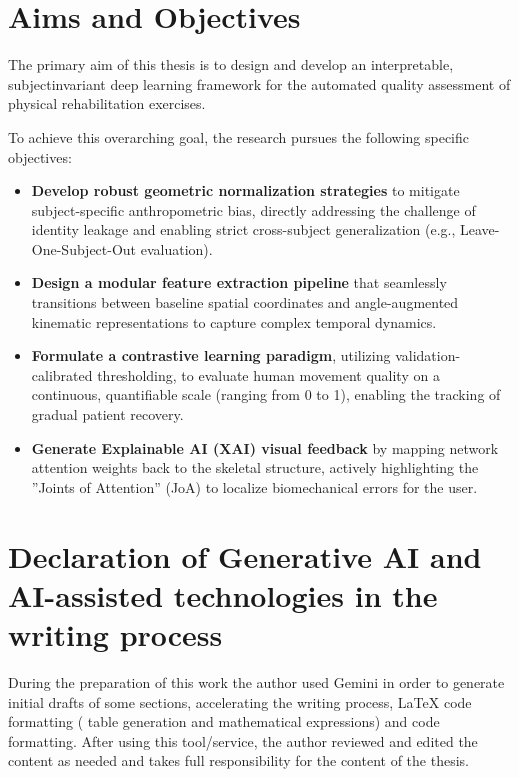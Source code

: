 \section{Aims and Objectives}
\label{sec:intro-aims}

The primary aim of this thesis is to design and develop an interpretable, subjectinvariant deep learning framework for the automated quality assessment of physical rehabilitation exercises. 

To achieve this overarching goal, the research pursues the following specific objectives:

\begin{itemize}
	\item \textbf{Develop robust geometric normalization strategies} to mitigate subject-specific anthropometric bias, directly addressing the challenge of identity leakage and enabling strict cross-subject generalization (e.g., Leave-One-Subject-Out evaluation).
	\item \textbf{Design a modular feature extraction pipeline} that seamlessly transitions between baseline spatial coordinates and angle-augmented kinematic representations to capture complex temporal dynamics.
	\item \textbf{Formulate a contrastive learning paradigm}, utilizing validation-calibrated thresholding, to evaluate human movement quality on a continuous, quantifiable scale (ranging from 0 to 1), enabling the tracking of gradual patient recovery.
	\item \textbf{Generate Explainable AI (XAI) visual feedback} by mapping network attention weights back to the skeletal structure, actively highlighting the ”Joints of Attention” (JoA) to localize biomechanical errors for the user.
\end{itemize}

\section{Declaration of Generative AI and AI-assisted technologies in the writing process}
\label{sec:intro-ai-disclosure}

During the preparation of this work the author used Gemini in order to generate initial drafts of some sections, accelerating the writing process, LaTeX code formatting ( table generation and mathematical expressions) and code formatting. After using this tool/service, the author reviewed and edited the content as needed and takes full responsibility for the content of the thesis.